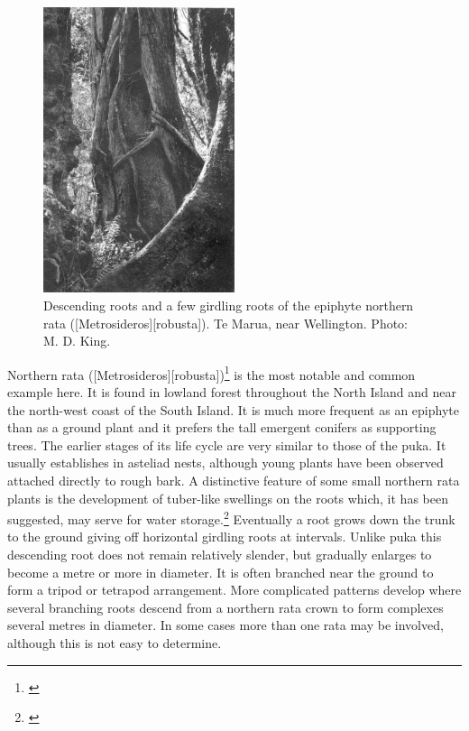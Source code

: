 \begin{figure}
	\includegraphics[width=0.5\textwidth]{graphics/figure50rata.jpg}
	\centering
	\caption[Descending roots and a few girdling roots of the epiphyte northern rata]{Descending roots and a few girdling roots of the epiphyte northern rata ([Metrosideros][robusta]).
Te Marua, near Wellington.
	Photo: M. D. King.}%
	\label{fig:50rata}
\end{figure}

Northern rata ([Metrosideros][robusta])\footnote{\cite{dawson1967growth}} is the most notable and common example here.
It is found in lowland forest throughout the North Island and near the north-west coast of the South Island.
It is much more frequent as an epiphyte than as a ground plant and it prefers the tall emergent conifers as supporting trees.
The earlier stages of its life cycle are very similar to those of the puka.
It usually establishes in asteliad nests, although young plants have been observed attached directly to rough bark.
A distinctive feature of some small northern rata plants is the development of tuber-like swellings on the roots which, it has been suggested, may serve for water storage.\footnote{\cite{beddie1953root}}
Eventually a root grows down the trunk to the ground giving off horizontal girdling roots at intervals.
Unlike puka this descending root does not remain relatively slender, but gradually enlarges to become a metre or more in diameter.
It is often branched near the ground to form a tripod or tetrapod arrangement.
More complicated patterns develop where several branching roots descend from a northern rata crown to form complexes several metres in diameter.
In some cases more than one rata may be involved, although this is not easy to determine.

